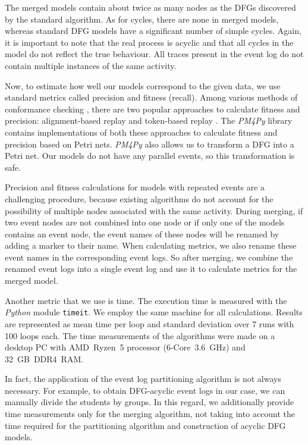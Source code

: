 \documentclass[11pt]{article}
\theoremstyle{definition}
\begin{document}
The merged models contain about twice as many nodes as the DFGs discovered by the standard algorithm. 
As for cycles, there are none in merged models, whereas standard DFG models have a significant number of simple cycles. 
Again, it is important to note that the real process is acyclic and that all cycles in the model do not reflect the true behaviour. 
All traces present in the event log do not contain multiple instances of the same activity.

Now, to estimate how well our models correspond to the given data, we use standard metrics called precision and fitness (recall).  
Among various methods of conformance checking \citep{CarmonaDSW18}, there are two popular approaches to calculate fitness and precision: alignment-based replay \citep{Van_der_Aalst2012-kp} and token-based replay \citep{Rozinat2008-bd}. 
The \emph{PM4Py} library contains implementations of both these approaches to calculate fitness \citep{Berti2019-op, Buijs2014-dy} and precision \citep{Munoz-Gama2010-qe, Adriansyah2015-hv} based on Petri nets. \emph{PM4Py} also allows us to transform a DFG into a Petri net. 
Our models do not have any parallel events, so this transformation is safe.

Precision and fitness calculations for models with repeated events are a challenging procedure, because existing algorithms do not account for the possibility of multiple nodes associated with the same activity.  
During merging, if two event nodes are not combined into one node or if only one of the models contains an event node, the event names of these nodes will be renamed by adding a marker to their name. 
When calculating metrics, we also rename these event names in the corresponding event logs. So after merging, we combine the renamed event logs into a single event log and use it to calculate metrics for the merged model.

Another metric that we use is time. The execution time is measured with the \emph{Python} module \texttt{timeit}. 
We employ the same machine for all calculations.
Results are represented as mean time per loop and standard deviation over 7 runs with 100 loops each. The time measurements of the algorithms were made on a desktop PC with AMD~Ryzen~5 processor (6-Core~3.6~GHz) and 32~GB~DDR4~RAM. 

In fact, the application of the event log partitioning algorithm is not always necessary. For example, to obtain DFG-acyclic event logs in our case, we can manually divide the students by groups. In this regard, we additionally provide time measurements only for the merging algorithm, not taking into account the time required for the partitioning algorithm and construction of acyclic DFG models.
\end{document}
